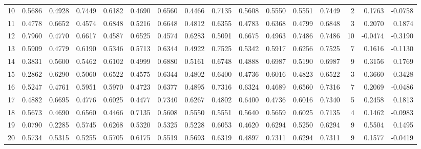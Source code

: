 \begin{tabular}{lrrrrrrrrrrrrrrr}
10  &      0.5686 &  0.4928 &  0.7449 &  0.6182 &  0.4690 &  0.6560 &  0.4466 &  0.7135 &  0.5608 &  0.5550 &   0.5551 &     0.7449 &      2 &                    0.1763 &                    -0.0758 \\
11  &      0.4778 &  0.6652 &  0.4574 &  0.6848 &  0.5216 &  0.6648 &  0.4812 &  0.6355 &  0.4783 &  0.6368 &   0.4799 &     0.6848 &      3 &                    0.2070 &                     0.1874 \\
12  &      0.7960 &  0.4770 &  0.6617 &  0.4587 &  0.6525 &  0.4574 &  0.6283 &  0.5091 &  0.6675 &  0.4963 &   0.7486 &     0.7486 &     10 &                   -0.0474 &                    -0.3190 \\
13  &      0.5909 &  0.4779 &  0.6190 &  0.5346 &  0.5713 &  0.6344 &  0.4922 &  0.7525 &  0.5342 &  0.5917 &   0.6256 &     0.7525 &      7 &                    0.1616 &                    -0.1130 \\
14  &      0.3831 &  0.5600 &  0.5462 &  0.6102 &  0.4999 &  0.6880 &  0.5161 &  0.6748 &  0.4888 &  0.6987 &   0.5190 &     0.6987 &      9 &                    0.3156 &                     0.1769 \\
15  &      0.2862 &  0.6290 &  0.5060 &  0.6522 &  0.4575 &  0.6344 &  0.4802 &  0.6400 &  0.4736 &  0.6016 &   0.4823 &     0.6522 &      3 &                    0.3660 &                     0.3428 \\
16  &      0.5247 &  0.4761 &  0.5951 &  0.5970 &  0.4723 &  0.6377 &  0.4895 &  0.7316 &  0.6324 &  0.4689 &   0.6560 &     0.7316 &      7 &                    0.2069 &                    -0.0486 \\
17  &      0.4882 &  0.6695 &  0.4776 &  0.6025 &  0.4477 &  0.7340 &  0.6267 &  0.4802 &  0.6400 &  0.4736 &   0.6016 &     0.7340 &      5 &                    0.2458 &                     0.1813 \\
18  &      0.5673 &  0.4690 &  0.6560 &  0.4466 &  0.7135 &  0.5608 &  0.5550 &  0.5551 &  0.5640 &  0.5659 &   0.6025 &     0.7135 &      4 &                    0.1462 &                    -0.0983 \\
19  &      0.0790 &  0.2285 &  0.5745 &  0.6268 &  0.5320 &  0.5325 &  0.5228 &  0.6053 &  0.4620 &  0.6294 &   0.5250 &     0.6294 &      9 &                    0.5504 &                     0.1495 \\
20  &      0.5734 &  0.5315 &  0.5255 &  0.5705 &  0.6175 &  0.5519 &  0.5693 &  0.6319 &  0.4897 &  0.7311 &   0.6294 &     0.7311 &      9 &                    0.1577 &                    -0.0419 \\

\end{tabular}
